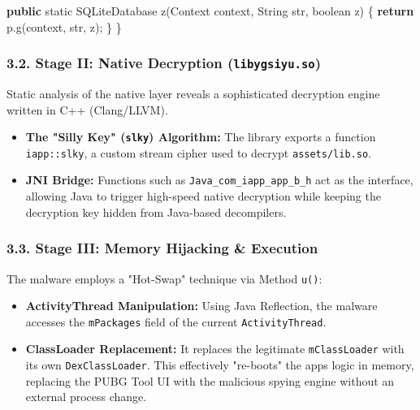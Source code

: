\documentclass[
]{article}
\newenvironment{Shaded}{}{}
\newcommand{\BuiltInTok}[1]{\textcolor[rgb]{0.00,0.50,0.00}{#1}}
\newcommand{\ControlFlowTok}[1]{\textcolor[rgb]{0.00,0.44,0.13}{\textbf{#1}}}
\newcommand{\DataTypeTok}[1]{\textcolor[rgb]{0.56,0.13,0.00}{#1}}
\newcommand{\FunctionTok}[1]{\textcolor[rgb]{0.02,0.16,0.49}{#1}}
\newcommand{\KeywordTok}[1]{\textcolor[rgb]{0.00,0.44,0.13}{\textbf{#1}}}
\newcommand{\NormalTok}[1]{#1}
\newcommand{\OperatorTok}[1]{\textcolor[rgb]{0.40,0.40,0.40}{#1}}
\begin{document}
\begin{Shaded}
\begin{Highlighting}[]
    \KeywordTok{public} \DataTypeTok{static}\NormalTok{ SQLiteDatabase }\FunctionTok{z}\OperatorTok{(}\BuiltInTok{Context}\NormalTok{ context}\OperatorTok{,} \BuiltInTok{String}\NormalTok{ str}\OperatorTok{,} \DataTypeTok{boolean}\NormalTok{ z}\OperatorTok{)} \OperatorTok{\{}
        \ControlFlowTok{return}\NormalTok{ p}\OperatorTok{.}\FunctionTok{g}\OperatorTok{(}\NormalTok{context}\OperatorTok{,}\NormalTok{ str}\OperatorTok{,}\NormalTok{ z}\OperatorTok{);}
    \OperatorTok{\}}
\OperatorTok{\}}
\end{Highlighting}
\end{Shaded}

\subsubsection{\texorpdfstring{\textbf{3.2. Stage II: Native Decryption
(\texttt{libygsiyu.so})}}{3.2. Stage II: Native Decryption (libygsiyu.so)}}\label{32-stage-ii-native-decryption-libygsiyuso}

Static analysis of the native layer reveals a sophisticated decryption
engine written in C++ (Clang/LLVM).

\begin{itemize}
\item
  \textbf{The "Silly Key" (\texttt{slky}) Algorithm:} The library
  exports a function \texttt{iapp::slky}, a custom stream cipher used to
  decrypt \texttt{assets/lib.so}.
\item
  \textbf{JNI Bridge:} Functions such as
  \texttt{Java\_com\_iapp\_app\_b\_h} act as the interface, allowing
  Java to trigger high-speed native decryption while keeping the
  decryption key hidden from Java-based decompilers.
\end{itemize}

\subsubsection{\texorpdfstring{\textbf{3.3. Stage III: Memory Hijacking
\&
Execution}}{3.3. Stage III: Memory Hijacking \& Execution}}\label{33-stage-iii-memory-hijacking--execution}

The malware employs a "Hot-Swap" technique via Method \texttt{u()}:

\begin{itemize}
\item
  \textbf{ActivityThread Manipulation:} Using Java Reflection, the
  malware accesses the \texttt{mPackages} field of the current
  \texttt{ActivityThread}.
\item
  \textbf{ClassLoader Replacement:} It replaces the legitimate
  \texttt{mClassLoader} with its own \texttt{DexClassLoader}. This
  effectively "re-boots" the app\textquotesingle s logic in memory,
  replacing the PUBG Tool UI with the malicious spying engine without an
  external process change.
\end{itemize}
\end{document}
